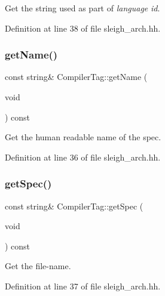 Get the string used as part of {\itshape language} {\itshape id}. 



Definition at line 38 of file sleigh\+\_\+arch.\+hh.

\mbox{\label{class_compiler_tag_a6a6a45f36e7a1b2896f6a3a5e2cbc89a}} 
\subsubsection{\texorpdfstring{getName()}{getName()}}
{\footnotesize\ttfamily const string\& Compiler\+Tag\+::get\+Name (\begin{DoxyParamCaption}\item[{void}]{ }\end{DoxyParamCaption}) const\hspace{0.3cm}{\ttfamily [inline]}}



Get the human readable name of the spec. 



Definition at line 36 of file sleigh\+\_\+arch.\+hh.

\mbox{\label{class_compiler_tag_a35c6f109fb8f3545fc05cf842dea4348}} 
\subsubsection{\texorpdfstring{getSpec()}{getSpec()}}
{\footnotesize\ttfamily const string\& Compiler\+Tag\+::get\+Spec (\begin{DoxyParamCaption}\item[{void}]{ }\end{DoxyParamCaption}) const\hspace{0.3cm}{\ttfamily [inline]}}



Get the file-\/name. 



Definition at line 37 of file sleigh\+\_\+arch.\+hh.

\mbox{\label{class_compiler_tag_a6c2e63a701c04436828ffe665bbb054e}} 
